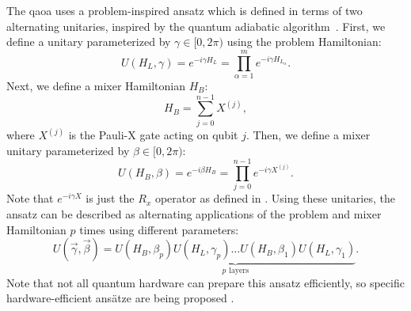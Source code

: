 The \gls{qaoa} uses a problem-inspired ansatz which is defined in terms of two alternating unitaries, inspired by the quantum adiabatic algorithm~\cite{farhi2014quantum}.
First, we define a unitary parameterized by $\gamma \in [0, 2\pi)$ using the problem Hamiltonian:
\begin{equation}
U(H_L, \gamma) = e^{-i\gamma H_L} = \prod_{\alpha=1}^{m} e^{-i\gamma H_{L_\alpha}}.
\end{equation}
Next, we define a mixer Hamiltonian $H_B$:
\begin{equation}
H_B = \sum_{j=0}^{n-1} X^{(j)},
\end{equation}
where $X^{(j)}$ is the Pauli-X gate acting on qubit $j$.
Then, we define a mixer unitary parameterized by $\beta \in [0, 2\pi)$:
\begin{equation}
U(H_B, \beta) = e^{-i\beta H_B} = \prod_{j=0}^{n-1} e^{-i\gamma X^{(j)}}.
\end{equation}
Note that $e^{-i\gamma X}$ is just the $R_x$ operator as defined in .
Using these unitaries, the ansatz can be described as alternating applications of the problem and mixer Hamiltonian $p$ times using different parameters:
\begin{equation}
U(\vec{\gamma}, \vec{\beta}) = \underbrace{U(H_B, \beta_p)U(H_L, \gamma_p) \ldots U(H_B, \beta_1)U(H_L, \gamma_1)}_{p \:\, \text{layers}}.
\end{equation}
Note that not all quantum hardware can prepare this ansatz efficiently, so specific hardware-efficient ans{\"a}tze are being proposed \cite{kandala2017hardware, farhi2017quantum}.

